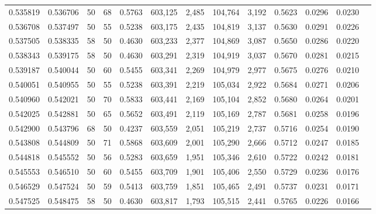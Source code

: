 \begin{tabular}{rrrrrrrrrrrrr}
0.535819 & 0.536706 &    50 &  68 &                                     0.5763 & 603,125 &   2,485 & 104,764 &   3,192 & 0.5623 & 0.0296 & 0.0230 \\
0.536708 & 0.537497 &    50 &  55 &                                     0.5238 & 603,175 &   2,435 & 104,819 &   3,137 & 0.5630 & 0.0291 & 0.0226 \\
0.537505 & 0.538335 &    58 &  50 &                                     0.4630 & 603,233 &   2,377 & 104,869 &   3,087 & 0.5650 & 0.0286 & 0.0220 \\
0.538343 & 0.539175 &    58 &  50 &                                     0.4630 & 603,291 &   2,319 & 104,919 &   3,037 & 0.5670 & 0.0281 & 0.0215 \\
0.539187 & 0.540044 &    50 &  60 &                                     0.5455 & 603,341 &   2,269 & 104,979 &   2,977 & 0.5675 & 0.0276 & 0.0210 \\
0.540051 & 0.540955 &    50 &  55 &                                     0.5238 & 603,391 &   2,219 & 105,034 &   2,922 & 0.5684 & 0.0271 & 0.0206 \\
0.540960 & 0.542021 &    50 &  70 &                                     0.5833 & 603,441 &   2,169 & 105,104 &   2,852 & 0.5680 & 0.0264 & 0.0201 \\
0.542025 & 0.542881 &    50 &  65 &                                     0.5652 & 603,491 &   2,119 & 105,169 &   2,787 & 0.5681 & 0.0258 & 0.0196 \\
0.542900 & 0.543796 &    68 &  50 &                                     0.4237 & 603,559 &   2,051 & 105,219 &   2,737 & 0.5716 & 0.0254 & 0.0190 \\
0.543808 & 0.544809 &    50 &  71 &                                     0.5868 & 603,609 &   2,001 & 105,290 &   2,666 & 0.5712 & 0.0247 & 0.0185 \\
0.544818 & 0.545552 &    50 &  56 &                                     0.5283 & 603,659 &   1,951 & 105,346 &   2,610 & 0.5722 & 0.0242 & 0.0181 \\
0.545553 & 0.546510 &    50 &  60 &                                     0.5455 & 603,709 &   1,901 & 105,406 &   2,550 & 0.5729 & 0.0236 & 0.0176 \\
0.546529 & 0.547524 &    50 &  59 &                                     0.5413 & 603,759 &   1,851 & 105,465 &   2,491 & 0.5737 & 0.0231 & 0.0171 \\
0.547525 & 0.548475 &    58 &  50 &                                     0.4630 & 603,817 &   1,793 & 105,515 &   2,441 & 0.5765 & 0.0226 & 0.0166 \\

\end{tabular}
